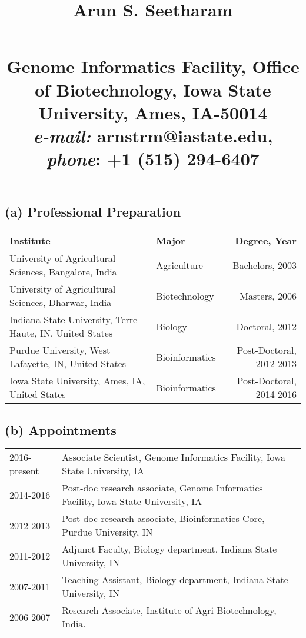 \documentclass[svgnames,11pt]{article}
\title{%
        \vspace{-2\baselineskip}
            \normalsize
            {\textbf{Arun S. Seetharam }}\\
            \vspace{0.5\baselineskip}
            \hrule
            \vspace{0.5\baselineskip}
            Genome Informatics Facility, Office of Biotechnology, Iowa State University, Ames, IA-50014 \\
            \textit{e-mail:} arnstrm@iastate.edu,
            \textit{phone}: +1 (515) 294-6407
        \vspace{-1.5ex}
}
\date{}
\begin{document}
\maketitle
\vspace{-4\baselineskip}
\subsection*{(a) Professional Preparation}
\begin{table}[H]
\centering
\begin{tabular}{llr}
\hline
Institute                                                & Major          & Degree, Year            \\ \hline
University of Agricultural Sciences, Bangalore, India    & Agriculture    & Bachelors, 2003       \\
University of Agricultural Sciences, Dharwar, India      & Biotechnology  & Masters, 2006       \\
Indiana State University, Terre Haute, IN, United States & Biology        & Doctoral, 2012              \\
Purdue University, West Lafayette, IN, United States     & Bioinformatics & Post-Doctoral, 2012-2013 \\
Iowa State University, Ames, IA, United States           & Bioinformatics & Post-Doctoral, 2014-2016 \\ \hline
\end{tabular}
\end{table}

\subsection*{(b) Appointments}
\begin{table}[H]
\centering
\begin{tabular}{ll}
2016-present & Associate Scientist, Genome Informatics Facility, Iowa State University, IA         \\
2014-2016   & Post-doc research associate, Genome Informatics Facility, Iowa State University, IA \\
2012-2013   & Post-doc research associate, Bioinformatics Core, Purdue University, IN             \\
2011-2012   & Adjunct Faculty, Biology department, Indiana State University, IN                   \\
2007-2011   & Teaching Assistant, Biology department, Indiana State University, IN                \\
2006-2007   & Research Associate, Institute of Agri-Biotechnology, India.                        
\end{tabular}
\end{table}
\end{document}

